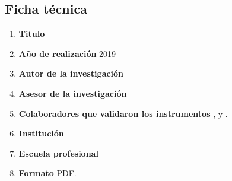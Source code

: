 \documentclass[12pt,a4paper]{article}
\begin{document}
\subsection{Ficha técnica\label{ficha tecnica}}
\begin{enumerate}
	\item \textbf{Titulo }\titulo\textbf{ }
	\item \textbf{Año de realización }2019
	\item \textbf{Autor de la investigación }\autor
	\item \textbf{Asesor de la investigación }\asesor
	\item \textbf{Colaboradores que validaron los instrumentos }\asesor, \expert y \expertt.
	\item \textbf{Institución } \lugar
	\item \textbf{Escuela profesional }\lugar
	\item \textbf{Formato }PDF.\textbf{ }


\end{enumerate}
\end{document}
